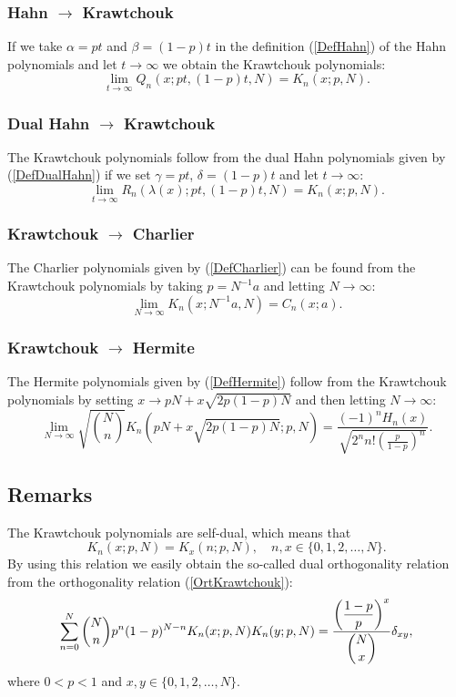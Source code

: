 \documentclass[envcountchap,graybox]{svmono}
\newcounter{rom}
\begin{document}
\subsubsection*{Hahn $\rightarrow$ Krawtchouk}
If we take $\alpha=pt$ and $\beta=(1-p)t$ in the definition (\ref{DefHahn}) of the Hahn
polynomials and let $t\rightarrow\infty$ we obtain the Krawtchouk polynomials:
$$\lim_{t\rightarrow\infty}Q_n(x;pt,(1-p)t,N)=K_n(x;p,N).$$

\subsubsection*{Dual Hahn $\rightarrow$ Krawtchouk}
The Krawtchouk polynomials follow from the dual Hahn polynomials given by
(\ref{DefDualHahn}) if we set $\gamma=pt$, $\delta=(1-p)t$ and let $t\rightarrow\infty$:
$$\lim_{t\rightarrow\infty}R_n(\lambda(x);pt,(1-p)t,N)=K_n(x;p,N).$$

\subsubsection*{Krawtchouk $\rightarrow$ Charlier}
The Charlier polynomials given by (\ref{DefCharlier}) can be found from the Krawtchouk
polynomials by taking $p=N^{-1}a$ and letting $N\rightarrow\infty$:
\begin{equation}
\lim_{N\rightarrow\infty}K_n(x;N^{-1}a,N)=C_n(x;a).
\end{equation}

\subsubsection*{Krawtchouk $\rightarrow$ Hermite}
The Hermite polynomials given by (\ref{DefHermite}) follow from the Krawtchouk polynomials
by setting $x\rightarrow pN+x\sqrt{2p(1-p)N}$ and then letting $N\rightarrow\infty$:
\begin{equation}
\lim_{N\rightarrow\infty}
\sqrt{\binom{N}{n}}K_n(pN+x\sqrt{2p(1-p)N};p,N)
=\frac{\displaystyle (-1)^nH_n(x)}{\displaystyle\sqrt{2^nn!\left(\frac{p}{1-p}\right)^n}}.
\end{equation}

\subsection*{Remarks}
The Krawtchouk polynomials are self-dual, which means that
$$K_n(x;p,N)=K_x(n;p,N),\quad n,x\in\{0,1,2,\ldots,N\}.$$
By using this relation we easily obtain the so-called dual orthogonality
relation from the orthogonality relation (\ref{OrtKrawtchouk}):
$$\sum_{n=0}^N\binom{N}{n}p^n(1-p)^{N-n} K_n(x;p,N)K_n(y;p,N)=
\frac{\displaystyle\left(\frac{1-p}{p}\right)^x}{\dbinom{N}{x}}\delta_{xy},$$
where $0 < p < 1$ and $x,y\in\{0,1,2,\ldots,N\}$.
\end{document}
